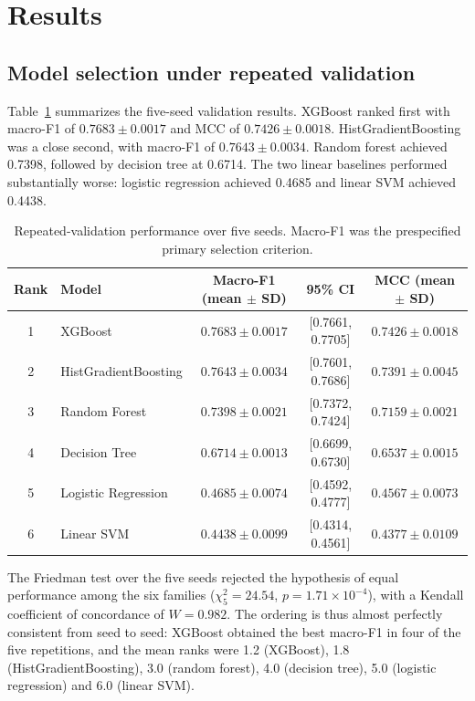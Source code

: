 \documentclass[10pt,twocolumn,a4paper]{article}
\begin{document}
\section{Results}

\subsection{Model selection under repeated validation}
\label{sec:selection}

Table~\ref{tab:validation} summarizes the five-seed validation results. XGBoost
ranked first with macro-F1 of $0.7683\pm0.0017$ and MCC of
$0.7426\pm0.0018$. HistGradientBoosting was a close second, with macro-F1 of
$0.7643\pm0.0034$. Random forest achieved 0.7398, followed by decision tree at
0.6714. The two linear baselines performed substantially worse: logistic
regression achieved 0.4685 and linear SVM achieved 0.4438.

\begin{table}[t]
\centering
\caption{Repeated-validation performance over five seeds. Macro-F1 was the
prespecified primary selection criterion.}
\label{tab:validation}
\small
\begin{tabular}{clccc}
\toprule
Rank & Model & Macro-F1 (mean $\pm$ SD) & 95\% CI & MCC (mean $\pm$ SD)\\
\midrule
1 & XGBoost & $0.7683\pm0.0017$ & [0.7661, 0.7705] & $0.7426\pm0.0018$\\
2 & HistGradientBoosting & $0.7643\pm0.0034$ & [0.7601, 0.7686] & $0.7391\pm0.0045$\\
3 & Random Forest & $0.7398\pm0.0021$ & [0.7372, 0.7424] & $0.7159\pm0.0021$\\
4 & Decision Tree & $0.6714\pm0.0013$ & [0.6699, 0.6730] & $0.6537\pm0.0015$\\
5 & Logistic Regression & $0.4685\pm0.0074$ & [0.4592, 0.4777] & $0.4567\pm0.0073$\\
6 & Linear SVM & $0.4438\pm0.0099$ & [0.4314, 0.4561] & $0.4377\pm0.0109$\\
\bottomrule
\end{tabular}
\end{table}

The Friedman test over the five seeds rejected the hypothesis of equal
performance among the six families ($\chi^2_{5}=24.54$, $p=1.71\times10^{-4}$),
with a Kendall coefficient of concordance of $W=0.982$. The ordering is thus
almost perfectly consistent from seed to seed: XGBoost obtained the best
macro-F1 in four of the five repetitions, and the mean ranks were 1.2
(XGBoost), 1.8 (HistGradientBoosting), 3.0 (random forest), 4.0 (decision
tree), 5.0 (logistic regression) and 6.0 (linear SVM).
\end{document}
